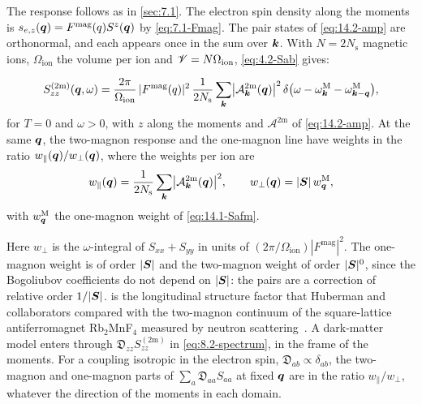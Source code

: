 The response follows as in \cref{sec:7.1}. The electron spin density along the moments is $s_{e,z}(\bm{q}) = F^{\mathrm{mag}}(q)S^z(\bm{q})$ by \cref{eq:7.1-Fmag}. The pair states of \cref{eq:14.2-amp} are orthonormal, and each appears once in the sum over $\bm{k}$. With $N = 2N_{\mathrm{s}}$ magnetic ions, $\Omega_{\mathrm{ion}}$ the volume per ion and $\mathscr{V} = N\Omega_{\mathrm{ion}}$, \cref{eq:4.2-Sab} gives:
\begin{keyresult}
\begin{equation}
  S^{(2\mathrm{m})}_{zz}(\bm{q},\omega) = \frac{2\pi}{\Omega_{\mathrm{ion}}}\,|F^{\mathrm{mag}}(q)|^2\,\frac{1}{2N_{\mathrm{s}}}\sum_{\bm{k}}\bigl|\mathcal{A}^{\mathrm{2m}}_{\bm{k}}(\bm{q})\bigr|^2\,\delta\bigl(\omega - \omega^{\mathrm{M}}_{\bm{k}} - \omega^{\mathrm{M}}_{\bm{k}-\bm{q}}\bigr) ,
  \label{eq:14.2-S2m}
\end{equation}
for $T = 0$ and $\omega > 0$, with $z$ along the moments and $\mathcal{A}^{\mathrm{2m}}$ of \cref{eq:14.2-amp}. At the same $\bm{q}$, the two-magnon response and the one-magnon line have weights in the ratio $w_\parallel(\bm{q})/w_\perp(\bm{q})$, where the weights per ion are
\begin{equation}
  w_\parallel(\bm{q}) = \frac{1}{2N_{\mathrm{s}}}\sum_{\bm{k}}\bigl|\mathcal{A}^{\mathrm{2m}}_{\bm{k}}(\bm{q})\bigr|^2 , \qquad
  w_\perp(\bm{q}) = |\bm{S}|\,w^{\mathrm{M}}_{\bm{q}} ,
  \label{eq:14.2-wpar}
\end{equation}
with $w^{\mathrm{M}}_{\bm{q}}$ the one-magnon weight of \cref{eq:14.1-Safm}.
\end{keyresult}
\noindent Here $w_\perp$ is the $\omega$-integral of $S_{xx} + S_{yy}$ in units of $(2\pi/\Omega_{\mathrm{ion}})|F^{\mathrm{mag}}|^2$. The one-magnon weight is of order $|\bm{S}|$ and the two-magnon weight of order $|\bm{S}|^0$, since the Bogoliubov coefficients do not depend on $|\bm{S}|$: the pairs are a correction of relative order $1/|\bm{S}|$.  is the longitudinal structure factor that Huberman and collaborators compared with the two-magnon continuum of the square-lattice antiferromagnet Rb$_2$MnF$_4$ measured by neutron scattering~\cite[Eq.~(5)]{huberman2005two}. A dark-matter model enters through $\mathfrak{D}_{zz}S^{(2\mathrm{m})}_{zz}$ in \cref{eq:8.2-spectrum}, in the frame of the moments. For a coupling isotropic in the electron spin, $\mathfrak{D}_{ab} \propto \delta_{ab}$, the two-magnon and one-magnon parts of $\sum_a\mathfrak{D}_{aa}S_{aa}$ at fixed $\bm{q}$ are in the ratio $w_\parallel/w_\perp$, whatever the direction of the moments in each domain.

